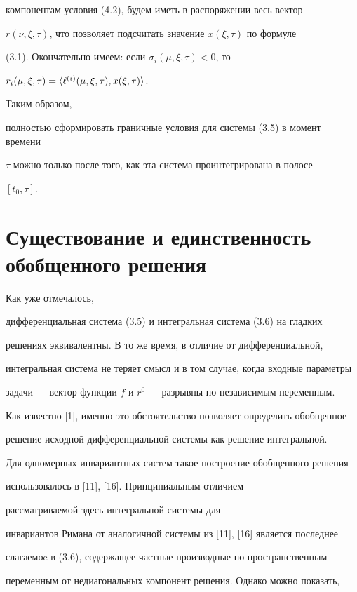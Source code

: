компонентам условия (4.2), будем иметь в распоряжении весь вектор 


$r(\nu,\xi,\tau)$, что позволяет подсчитать значение $x(\xi,\tau)$ по формуле


(3.1). Окончательно имеем: если $\sigma_i (\mu,\xi,\tau) < 0$, то


$r_i (\mu,\xi,\tau)=\langle\ell^{(i)} (\mu,\xi,\tau), x(\xi,\tau)\rangle$.


Таким образом,


полностью сформировать граничные условия для системы (3.5) в момент времени


$\tau$ можно только после того, как эта система проинтегрирована в полосе


$[t_0, \tau]$.





\section{Существование и единственность обобщенного решения} 





Как уже отмечалось, 


дифференциальная система (3.5) и интегральная система (3.6) на гладких 


решениях эквивалентны. В то же время, в отличие от дифференциальной, 


интегральная система не теряет смысл и в том случае, когда входные параметры


задачи --- вектор-функции $f$ и $r^0$ --- разрывны по независимым переменным.


Как известно [1], именно это обстоятельство позволяет определить обобщенное 


решение исходной дифференциальной системы как решение интегральной. 


Для одномерных инвариантных систем такое построение обобщенного решения 


использовалось в [11], [16]. Принципиальным отличием


рассматриваемой здесь интегральной системы для 


инвариантов Римана от аналогичной системы из [11], [16] является последнее 


слагаемоe в (3.6), содержащее частные производные по пространственным 


переменным от недиагональных компонент решения. Однако можно показать, 


